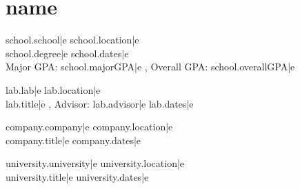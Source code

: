 \begin{minipage}{\textwidth}
\section*{ {{ name }} }

{%
  {%
    {\large {{ school.school|e }} } \hfill {{ school.location|e }} \\
    {{ school.degree|e }} \hfill {{ school.dates|e }} \\
    Major GPA: {{ school.majorGPA|e }}, Overall GPA: {{ school.overallGPA|e }}
    \vspace{3mm}
  {%
{%
  {%
    {\large {{ lab.lab|e }} } \hfill {{ lab.location|e }} \\
    {{ lab.title|e }}, Advisor: {{ lab.advisor|e }} \hfill {{ lab.dates|e }}
    \vspace{3mm}
  {%
{%
  {%
    {\large {{ company.company|e }} } \hfill {{ company.location|e }} \\
    {{ company.title|e }} \hfill {{ company.dates|e }}
    \vspace{3mm}
  {%
{%
  {%
    {\large {{ university.university|e }} }\hfill {{ university.location|e }} \\
    {{ university.title|e }} \hfill {{ university.dates|e }}
    \vspace{3mm}
  {%
{%
  {%
}}}}}}}}}}}}}}
\end{minipage}
